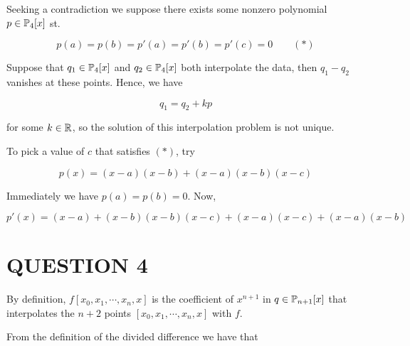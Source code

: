 \documentclass[a4paper]{article}
\begin{document}
%
%
%
%
%
%
%
%
%
%
%
%

Seeking a contradiction we suppose there exists some nonzero polynomial $ p \in \P_{4} [x] $ st. 

\[ p(a) = p(b) = p'(a) = p'(b) = p'(c) = 0 \qquad (*) \] 


Suppose that $ q_{1} \in \P_{4} [x] $ and $ q_{2} \in \P_{4} [x] $ both interpolate the data, then $ q_{1} - q_{2}  $ vanishes at these points. Hence, we have

\[ q_{1} = q_{2} + k p \]

for some $ k \in \R $, so the solution of this interpolation problem is not unique. 

To pick a value of $ c $ that satisfies $ (*) $, try

\[ p(x) = (x - a)(x - b) + (x - a)(x - b)(x - c) \]

Immediately we have $ p(a) = p(b) = 0 $. Now, 

\[ p'(x) =  (x- a) + (x - b)  (x - b)(x - c) +  (x - a)(x - c) +  (x - a)(x - b)   \]


\section{QUESTION 4}


By definition, $ f[x_{0},x_{1},\cdots,x_{n},x] $ is the coefficient of $ x^{n+1} $ in $ q  \in \P_{n+1}[x] $ that interpolates the $ n+2 $ points $ [x_{0},x_{1},\cdots,x_{n},x] $ with $ f $.

From the definition of the divided difference we have that
\end{document}
